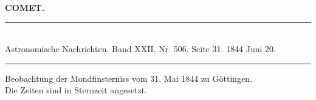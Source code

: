 \clearpage
\begingroup
\pagestyle{empty}
\thispagestyle{empty}
\noindent{}%
%
\parbox[t]{\dimexpr\linewidth-24mm\relax}{\centering\footnotesize\bfseries COMET.\par}%
\makebox[12mm][r]{}\par\nobreak\medskip
\begin{center}
\rule{0.55\linewidth}{0.4pt}\\[2pt]
Astronomische Nachrichten. Band XXII. Nr. 506. Seite 31. 1844 Juni 20.\\[2pt]
\rule{0.55\linewidth}{0.4pt}
\end{center}
\begin{center}
Beobachtung der Mondfinsterniss vom 31. Mai 1844 zu Göttingen.\\
Die Zeiten sind in Sternzeit angesetzt.
\end{center}

